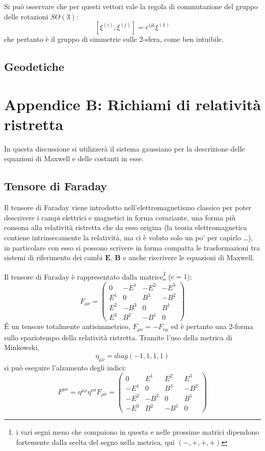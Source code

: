 Si può osservare che per questi vettori vale la regola di commutazione del gruppo delle rotazioni $SO(3)$:
\begin{equation*}
    \left[ \xi^{(i)} , \xi^{(j)} \right] = \epsilon^{ijk}\xi^{(k)}
\end{equation*}
che pertanto è il gruppo di simmetrie sulle 2-sfera, come ben intuibile.
\subsection{Geodetiche}

\section{Appendice B: Richiami di relatività ristretta}
In questa discussione si utilizzerà il sistema gaussiano per la descrizione delle equazioni di Maxwell e delle costanti in esse.
\subsection{Tensore di Faraday}
Il tensore di Faraday viene introdotto nell'elettromagnetismo classico per poter descrivere i campi elettrici e magnetici in forma covariante, una forma più consona alla relatività ristretta che da esso origina (la teoria elettromagnetica contiene intrinsecamente la relatività, ma ci è voluto solo un po' per capirlo \dots), in particolare con esso si possono scrivere in forma compatta le trasformazioni tra sistemi di riferimento dei cambi $\bm{E}$, $\bm{B}$ e anche riscrivere le equazioni di Maxwell.

Il tensore di Faraday è rappresentato dalla matrice\footnote{i vari segni meno che compaiono in questa e nelle prossime matrici dipendono fortemente dalla scelta del segno nella metrica, qui $(-,+,+,+)$} ($c=1$):
\begin{equation*}
    F_{\mu \nu}= \begin{pmatrix}
    0 & -E^1 & -E^2 & -E^3 \\
    E^1 & 0 & B^3& -B^2 \\
    E^2 & -B^3 & 0 & B^1 \\
    E^3 & B^2 & -B^1 & 0
    \end{pmatrix}
\end{equation*}
\'{E} un tensore totalmente antisimmetrico, $F_{\mu\nu}= - F_{\nu\mu}$ ed è pertanto una 2-forma sullo spaziotempo della relatività ristretta.
Tramite l'uso della metrica di Minkowski,
\begin{equation}
    \eta_{\mu\nu} = diag(-1,1,1,1)
    \label{eq.metricaminko}
\end{equation}
si può eseguire l'alzamento degli indici:
\begin{equation*}
    F^{\mu\nu} = \eta^{\mu\rho}\eta^{\nu\sigma}F_{\rho\sigma} = 
    \begin{pmatrix}
    0 & E^1 & E^2 & E^3 \\
    -E^1 & 0 & B^3& -B^2 \\
    -E^2 & -B^3 & 0 & B^1 \\
    -E^3 & B^2 & -B^1 & 0
    \end{pmatrix}
\end{equation*}

